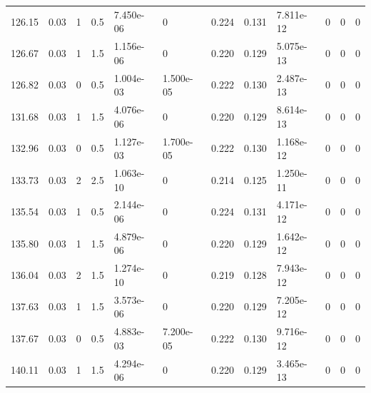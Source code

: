 \documentclass[preview]{standalone}
\begin{document}
{{{\begin{tabular}{L{1.2cm}C{1.2cm} C{0.3cm}C{0.5cm} C{1.4cm}C{1.4cm} C{1.4cm}C{1.4cm} C{1.6cm}C{1.6cm} C{1.6cm}C{1.6cm}}
  126.15  &  0.03  & 1     & 0.5 &  7.450e-06  & 0  &  0.224&   0.131& 7.811e-12 & 0   &  0 & 0  \\ 
  126.67  &  0.03  & 1     & 1.5 &  1.156e-06  & 0  &  0.220&   0.129& 5.075e-13 & 0   &  0 & 0  \\ 
  126.82  &  0.03  & 0     & 0.5 &  1.004e-03  & 1.500e-05  &  0.222&   0.130& 2.487e-13 & 0   &  0 & 0  \\ 
  131.68  &  0.03  & 1     & 1.5 &  4.076e-06  & 0  &  0.220&   0.129& 8.614e-13 & 0   &  0 & 0  \\ 
  132.96  &  0.03  & 0     & 0.5 &  1.127e-03  & 1.700e-05  &  0.222&   0.130& 1.168e-12 & 0   &  0 & 0  \\ 
  133.73  &  0.03  & 2     & 2.5 &  1.063e-10  & 0  &  0.214&   0.125& 1.250e-11 & 0   &  0 & 0  \\ 
  135.54  &  0.03  & 1     & 0.5 &  2.144e-06  & 0  &  0.224&   0.131& 4.171e-12 & 0   &  0 & 0  \\ 
  135.80  &  0.03  & 1     & 1.5 &  4.879e-06  & 0  &  0.220&   0.129& 1.642e-12 & 0   &  0 & 0  \\ 
  136.04  &  0.03  & 2     & 1.5 &  1.274e-10  & 0  &  0.219&   0.128& 7.943e-12 & 0   &  0 & 0  \\ 
  137.63  &  0.03  & 1     & 1.5 &  3.573e-06  & 0  &  0.220&   0.129& 7.205e-12 & 0   &  0 & 0  \\ 
  137.67  &  0.03  & 0     & 0.5 &  4.883e-03  & 7.200e-05  &  0.222&   0.130& 9.716e-12 & 0   &  0 & 0  \\ 
  140.11  &  0.03  & 1     & 1.5 &  4.294e-06  & 0  &  0.220&   0.129& 3.465e-13 & 0   &  0 & 0  \\ 
\hline 
\end{tabular} 

}}}
\end{document}

